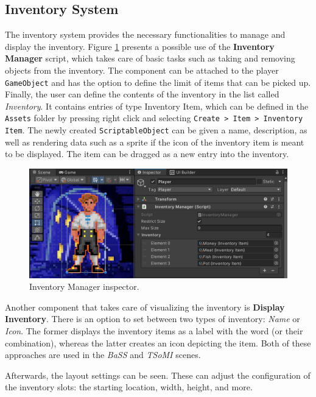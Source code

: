 \subsection{Inventory System}
\label{UD-IS}
The inventory system provides the necessary functionalities to manage and display the inventory. Figure \ref{fig:Manual-Inventory} presents a possible use of the \textbf{Inventory Manager} script, which takes care of basic tasks such as taking and removing objects from the inventory. The component can be attached to the player \verb|GameObject| and has the option to define the limit of items that can be picked up. Finally, the user can define the contents of the inventory in the list called \textit{Inventory}. It contains entries of type Inventory Item, which can be defined in the \verb|Assets| folder by pressing right click and selecting \verb|Create > Item > Inventory Item|. The newly created \verb|ScriptableObject| can be given a name, description, as well as rendering data such as a sprite if the icon of the inventory item is meant to be displayed. The item can be dragged as a new entry into the inventory.
\begin{figure}[H]
\centering
\includegraphics[width=1\linewidth]{img/User doc/inventory.png}
\caption{Inventory Manager inspector.}
\label{fig:Manual-Inventory}
\end{figure}

Another component that takes care of visualizing the inventory is \textbf{Display Inventory}. There is an option to set between two types of inventory: \textit{Name} or \textit{Icon}. The former displays the inventory items as a label with the word (or their combination), whereas the latter creates an icon depicting the item. Both of these approaches are used in the \textit{BaSS} and \textit{TSoMI} scenes.

Afterwards, the layout settings can be seen. These can adjust the configuration of the inventory slots: the starting location, width, height, and more. 

